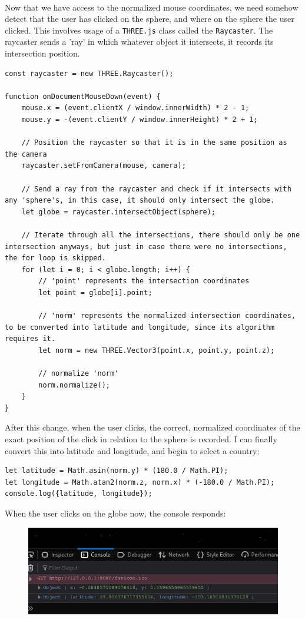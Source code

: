 \\ Now that we have access to the normalized mouse coordinates, we need somehow detect that the user has clicked on the sphere, and where on the sphere the user clicked. This involves usage of a \verb|THREE.js| class called the \verb|Raycaster|. The raycaster sends a 'ray' in which whatever object it intersects, it records its intersection position.
\begin{lstlisting}
const raycaster = new THREE.Raycaster();

function onDocumentMouseDown(event) {
    mouse.x = (event.clientX / window.innerWidth) * 2 - 1;
    mouse.y = -(event.clientY / window.innerHeight) * 2 + 1;
    
    // Position the raycaster so that it is in the same position as the camera
    raycaster.setFromCamera(mouse, camera);

    // Send a ray from the raycaster and check if it intersects with any 'sphere's, in this case, it should only intersect the globe.
    let globe = raycaster.intersectObject(sphere);

    // Iterate through all the intersections, there should only be one intersection anyways, but just in case there were no intersections, the for loop is skipped.
    for (let i = 0; i < globe.length; i++) {
        // 'point' represents the intersection coordinates
        let point = globe[i].point;

        // 'norm' represents the normalized intersection coordinates, to be converted into latitude and longitude, since its algorithm requires it.
        let norm = new THREE.Vector3(point.x, point.y, point.z);

        // normalize 'norm'
        norm.normalize();
    }
}
\end{lstlisting}
After this change, when the user clicks, the correct, normalized coordinates of the exact position of the click in relation to the sphere is recorded. I can finally convert this into latitude and longitude, and begin to select a country:
\begin{lstlisting}
let latitude = Math.asin(norm.y) * (180.0 / Math.PI);
let longitude = Math.atan2(norm.z, norm.x) * (-180.0 / Math.PI);
console.log({latitude, longitude});
\end{lstlisting}
When the user clicks on the globe now, the console responds:
\begin{figure}[h]
\centering
\includegraphics[width=0.7\linewidth]{images/latlong}
\caption{}
\label{fig:latlong}
\end{figure}
